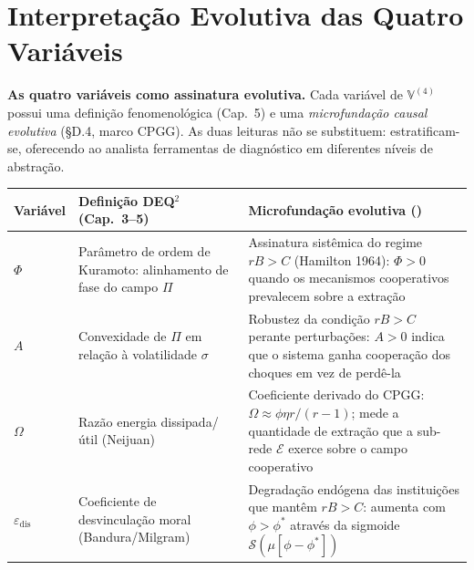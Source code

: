 \section{Interpreta\c{c}\~{a}o Evolutiva das Quatro Vari\'{a}veis}\label{interpretazione-evolutiva-quattro-variáveis}

\Hypoth{} \textbf{As quatro vari\'{a}veis como assinatura evolutiva.}
Cada vari\'{a}vel de \(\mathbb{V}^{(4)}\) possui uma defini\c{c}\~{a}o
fenomenol\'{o}gica (Cap.~5) e uma \emph{microfunda\c{c}\~{a}o causal
evolutiva} (§D.4, marco CPGG). As duas leituras n\~{a}o se substituem:
estratificam-se, oferecendo ao analista ferramentas de diagn\'{o}stico
em diferentes n\'{i}veis de abstra\c{c}\~{a}o.

{\def\LTcaptype{none}
{\small\begin{longtable}[]{@{}
  >{\raggedright\arraybackslash}p{}
  >{\raggedright\arraybackslash}p{}
  >{\raggedright\arraybackslash}p{}@{}}
\toprule\noalign{}
\begin{minipage}[b]{\linewidth}\raggedright
Vari\'{a}vel
\end{minipage} & \begin{minipage}[b]{\linewidth}\raggedright
Defini\c{c}\~{a}o DEQ$^2$ (Cap.~3--5)
\end{minipage} & \begin{minipage}[b]{\linewidth}\raggedright
Microfunda\c{c}\~{a}o evolutiva (\Hypoth{})
\end{minipage} \\
\midrule\noalign{}
\endhead
\bottomrule\noalign{}
\endlastfoot
\(\Phi\) & Par\^{a}metro de ordem de Kuramoto: alinhamento de fase do campo
\(\Pi\) & Assinatura sist\^{e}mica do regime \(rB > C\) (Hamilton 1964):
\(\Phi > 0\) quando os mecanismos cooperativos prevalecem sobre a
extra\c{c}\~{a}o \\ \addlinespace
\(A\) & Convexidade de \(\Pi\) em rela\c{c}\~{a}o \`{a} volatilidade
\(\sigma\) & Robustez da condi\c{c}\~{a}o \(rB > C\) perante
perturba\c{c}\~{o}es: \(A > 0\) indica que o sistema ganha
coopera\c{c}\~{a}o dos choques em vez de perd\^{e}-la \\ \addlinespace
\(\Omega\) & Raz\~{a}o energia dissipada/\'{u}til (Neijuan) & Coeficiente
derivado do CPGG: \(\Omega \approx \phi\eta r/(r-1)\); mede a quantidade
de extra\c{c}\~{a}o que a sub-rede \(\mathcal{E}\) exerce sobre o campo
cooperativo \\ \addlinespace
\(\varepsilon_{\text{dis}}\) & Coeficiente de desvincula\c{c}\~{a}o moral
(Bandura/Milgram) & Degrada\c{c}\~{a}o end\'{o}gena das institui\c{c}\~{o}es
que mant\^{e}m \(rB > C\): aumenta com \(\phi > \phi^*\) atrav\'{e}s da
sigmoide \(\mathcal{S}(\mu[\phi - \phi^*])\) \\
\end{longtable}}
}

